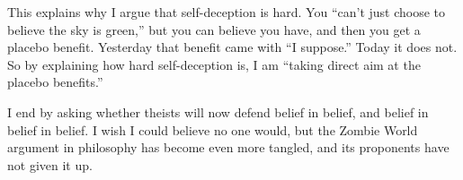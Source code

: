 This explains why I argue that self-deception is hard. You ``can't just choose to believe the sky is green,'' but you can believe you have, and then you get a placebo benefit. Yesterday that benefit came with ``I suppose.'' Today it does not. So by explaining how hard self-deception is, I am ``taking direct aim at the placebo benefits.''

I end by asking whether theists will now defend belief in belief, and belief in belief in belief. I wish I could believe no one would, but the Zombie World argument in philosophy has become even more tangled, and its proponents have not given it up.
